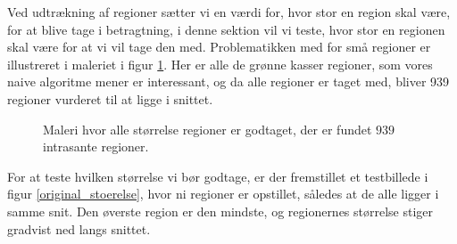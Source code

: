 {
Ved udtrækning af regioner sætter vi en værdi for, hvor stor en region skal
være, for at blive tage i betragtning, i denne sektion vil vi teste, hvor stor
en regionen skal være for at vi vil tage den med. Problematikken med for små
regioner er illustreret i maleriet i figur \ref{alt_med}. Her er alle de grønne
kasser regioner, som vores naive algoritme mener er interessant, og da
alle regioner er taget med, bliver 939 regioner vurderet til at ligge i
snittet.

\begin{figure}[¡h]
    \setlength\fboxsep{0pt}
    \setlength\fboxrule{0.5pt}
    \begin{center}
    \end{center}
    \caption{Maleri hvor alle størrelse regioner er godtaget, der er fundet $939$ intrasante regioner.}
	\label{alt_med}
\end{figure}

For at teste hvilken størrelse vi bør godtage, er der fremstillet et
testbillede i figur \ref{original_stoerelse}, hvor ni regioner er opstillet,
således at de alle ligger i samme snit. Den øverste region er den mindste, og
regionernes størrelse stiger gradvist ned langs snittet.

}
